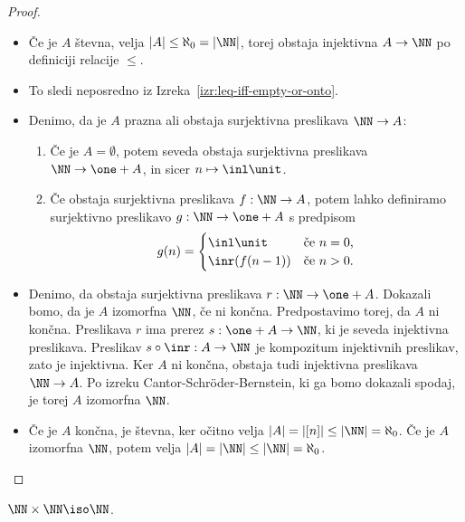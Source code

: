 \begin{proof}
%
\begin{itemize}
\item[$(1 \lthen 2)$]
%
Če je $A$ števna, velja $|A| \leq \aleph_0 = |\NN|$, torej obstaja injektivna $A \to
\NN$ po definiciji relacije $\leq$.

\item[$(2 \lthen 3)$]
%
To sledi neposredno iz Izreka~\ref{izr:leq-iff-empty-or-onto}.

\item[$(3 \lthen 4)$]
%
Denimo, da je $A$ prazna ali obstaja surjektivna preslikava $\NN \to A$:
%
\begin{enumerate}
\item
  Če je $A = \emptyset$, potem seveda obstaja surjektivna preslikava $\NN \to \one + A$, in sicer
  $n \mapsto \inl \unit$.
\item 
  Če obstaja surjektivna preslikava $f : \NN \to A$, potem lahko definiramo surjektivno
  preslikavo $g : \NN \to \one + A$ s predpisom
  \begin{equation*}
    g(n) =
    \begin{cases}
      \inl \unit      &\text{če $n = 0$,}\\
      \inr (f(n-1))   &\text{če $n > 0$.}
    \end{cases}
  \end{equation*}
\end{enumerate}

\item[$(4 \lthen 5)$]
%
Denimo, da obstaja surjektivna preslikava $r : \NN \to \one + A$.
Dokazali bomo, da je $A$ izomorfna $\NN$, če ni končna.
Predpostavimo torej, da $A$ ni končna.
Preslikava $r$ ima prerez $s : \one + A \to \NN$, ki je seveda injektivna preslikava.
Preslikav $s \circ \inr : A \to \NN$ je kompozitum injektivnih preslikav, zato je injektivna.
Ker $A$ ni končna, obstaja tudi injektivna preslikava $\NN \to A$.
Po izreku Cantor-Schröder-Bernstein, ki ga bomo dokazali spodaj, je torej $A$ izomorfna $\NN$.

\item[$(5 \lthen 1)$]
%
Če je $A$ končna, je števna, ker očitno velja $|A| = |[n]| \leq |\NN| = \aleph_0$.
Če je $A$ izomorfna $\NN$, potem velja $|A| = |\NN| \leq |\NN| = \aleph_0$.
\end{itemize}
\end{proof}

\begin{izrek}
  $\NN \times \NN \iso \NN$.
\end{izrek}

